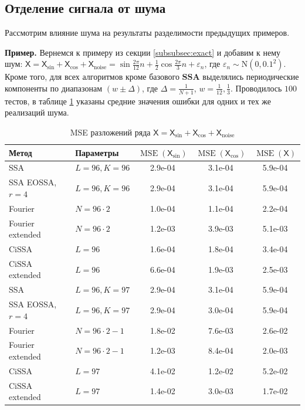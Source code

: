 \documentclass[a4paper, 11pt]{article}
\newcommand{\SSA}{\textbf{SSA}}
\newcommand{\TS}{\mathsf{X}}
\begin{document}
\subsection{Отделение сигнала от шума}


Рассмотрим влияние шума на результаты разделимости предыдущих примеров.

\textbf{\large{Пример.}} Вернемся к примеру из секции \ref{subsubsec:exact} и добавим к нему шум: $\TS = \TS_{\sin} + \TS_{\cos} + \TS_{\mathrm{noise}} = \sin{\frac{2\pi}{12}n} + \frac{1}{2}\cos{\frac{2\pi}{3}n} + \varepsilon_n$, где $\varepsilon_n \sim \mathrm N(0, 0.1^2)$.
Кроме того, для всех алгоритмов кроме базового $\SSA$ выделялись периодические компоненты по диапазонам $\left(w \pm \Delta \right)$, где $\Delta = \frac{1}{N+1}$, $w = \frac{1}{12}, \frac{1}{3}$.
 Проводилось $100$ тестов, в таблице \ref{tab:errs_fourier_cissa_sin_cos_noised} указаны средние значения ошибки для одних и тех же реализаций шума.
\begin{table}[H]
	\caption{MSE разложений ряда $\TS = \TS_{\sin} + \TS_{\cos} +\TS_{\mathrm{noise}}$ } 
	\centering
	\begin{tabular}{l|l|ccc}
			\hline
			Метод & Параметры &  $\operatorname{MSE}(\TS_{\sin})$ & $\operatorname{MSE}(\TS_{\cos})$ & $\operatorname{MSE}(\TS)$\\ 
			\hline
			SSA& $L = 96, K = 96 $ & 2.9e-04 & 3.1e-04 & 5.9e-04 \\ 
			SSA EOSSA, $r = 4$& $L = 96, K = 96 $ & 2.9e-04 & 3.1e-04 & 5.9e-04 \\ 
			Fourier & $N = 96 \cdot 2$& 1.0e-04 & 1.1e-04 & 2.2e-04 \\ 
			Fourier extended  & $N = 96 \cdot 2$& 1.2e-03 & 3.9e-03 & 5.1e-03 \\ 
			CiSSA &$L = 96$& 1.6e-04 & 1.8e-04 & 3.4e-04 \\ 
			CiSSA extended &$L = 96$ & 6.6e-04 & 1.9e-03 & 2.5e-03 \\ 
			\hline
			SSA& $L = 96, K = 97 $ & 2.9e-04 & 3.1e-04 & 5.9e-04 \\ 
			SSA EOSSA, $r = 4$& $L = 96, K = 97 $ &2.9e-04 & 3.0e-04 & 5.9e-04 \\ 
			Fourier & $N = 96 \cdot 2 - 1$& 1.8e-02 & 7.6e-03 & 2.6e-02 \\  
			Fourier extended  & $N = 96 \cdot 2 - 1$& 1.2e-03 & 8.4e-04 & 2.0e-03 \\ 
			CiSSA &$L = 97$&4.1e-02 & 1.2e-02 & 5.2e-02 \\ 
			CiSSA extended &$L = 97$ &1.4e-02 & 3.0e-03 & 1.7e-02 \\ 
			\hline
		\end{tabular}
	\label{tab:errs_fourier_cissa_sin_cos_noised}
\end{table}
\end{document}
